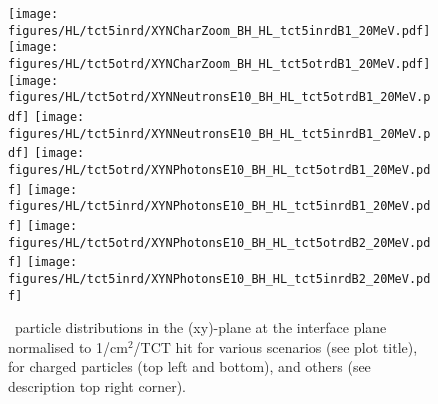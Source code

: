 \begin{figure}
  \begin{center}
    \texttt{[image: figures/HL/tct5inrd/XYNCharZoom\_BH\_HL\_tct5inrdB1\_20MeV.pdf]}
    \texttt{[image: figures/HL/tct5otrd/XYNCharZoom\_BH\_HL\_tct5otrdB1\_20MeV.pdf]} 
    \texttt{[image: figures/HL/tct5otrd/XYNNeutronsE10\_BH\_HL\_tct5otrdB1\_20MeV.pdf]}
    \texttt{[image: figures/HL/tct5inrd/XYNNeutronsE10\_BH\_HL\_tct5inrdB1\_20MeV.pdf]}
    \texttt{[image: figures/HL/tct5otrd/XYNPhotonsE10\_BH\_HL\_tct5otrdB1\_20MeV.pdf]}
    \texttt{[image: figures/HL/tct5inrd/XYNPhotonsE10\_BH\_HL\_tct5inrdB1\_20MeV.pdf]}
    \texttt{[image: figures/HL/tct5otrd/XYNPhotonsE10\_BH\_HL\_tct5otrdB2\_20MeV.pdf]}
    \texttt{[image: figures/HL/tct5inrd/XYNPhotonsE10\_BH\_HL\_tct5inrdB2\_20MeV.pdf]}

\end{center}
\vspace{-0.6cm}
 \caption{\fluka~particle distributions in the (xy)-plane at the interface plane normalised to 1/cm$^{2}$/TCT hit for various scenarios (see plot title), for charged particles (top left and bottom), and others (see description top right corner).
  \label{fig:XYN}}
\end{figure}

